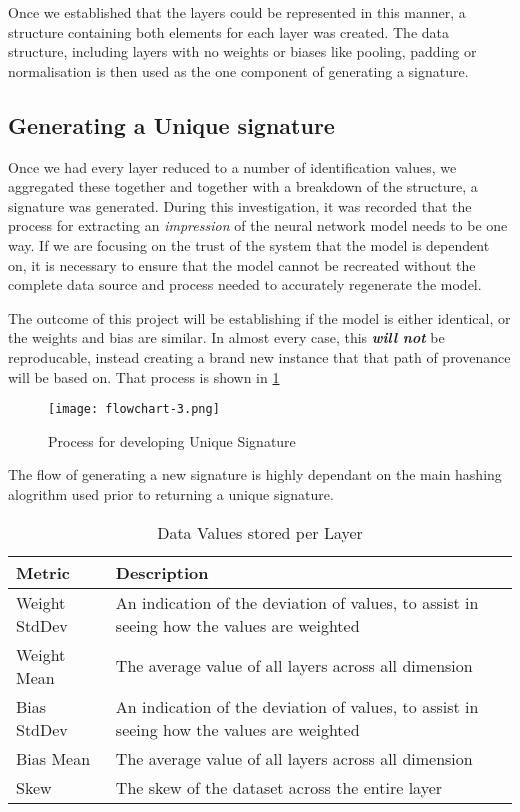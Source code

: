 Once we established that the layers could be represented in this manner, a structure containing both elements for each layer was created. The data structure, including layers with no weights or biases like pooling, padding or normalisation is then used as the one component of generating a signature.

\subsection{Generating a Unique signature}
Once we had every layer reduced to a number of identification values, we aggregated these together and together with a breakdown of the structure, a signature was generated. During this investigation, it was recorded that the process for extracting an \textit{impression} of the neural network model needs to be one way. If we are focusing on the trust of the system that the model is dependent on, it is necessary to ensure that the model cannot be recreated without the complete data source and process needed to accurately regenerate the model.

The outcome of this project will be establishing if the model is either identical, or the weights and bias are similar. In almost every case, this \textit{\textbf{will not}} be reproducable, instead creating a brand new instance that that path of provenance will be based on. That process is shown in \ref{fig_sig_generator}

\begin{figure}[!ht]
    \centering
    \texttt{[image: flowchart-3.png]}
    \caption{Process for developing Unique Signature}
    \label{fig_sig_generator}
\end{figure}

The flow of generating a new signature is highly dependant on the main hashing alogrithm used prior to returning a unique signature. 

\begin{table}[!ht]
    \centering
    \caption{Data Values stored per Layer}
    \setlength\tabcolsep{0pt} %
    \begin{tabular}{@{} p{2cm} p{6.5cm}  @{}}
        \hline
        Metric & Description \\
        \hline
        Weight StdDev  & An indication of the deviation of values, to assist in seeing how the values are weighted \\
        Weight Mean    & The average value of all layers across all dimension \\
        Bias StdDev  & An indication of the deviation of values, to assist in seeing how the values are weighted \\
        Bias Mean    & The average value of all layers across all dimension \\
        Skew   & The skew of the dataset across the entire layer \\
        \hline
    \end{tabular}
\end{table}

